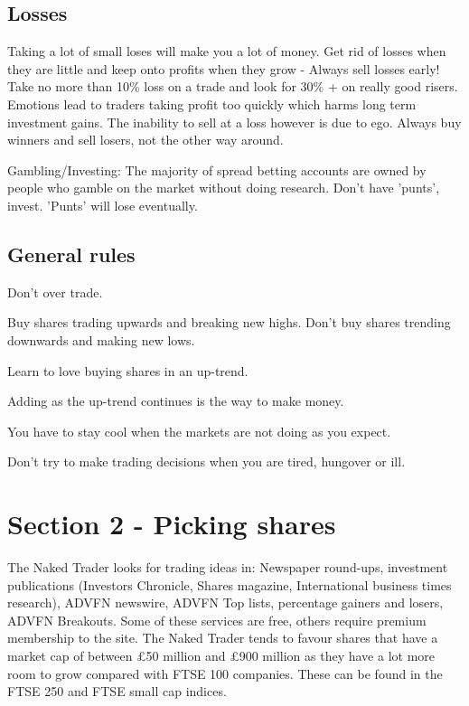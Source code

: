 \subsection*{Losses}
Taking a lot of small loses will make you a lot of money.
Get rid of losses when they are little and keep onto profits when they grow - Always sell losses early!
Take no more than 10\% loss on a trade and look for 30\% + on really good risers.
Emotions lead to traders taking profit too quickly which harms long term investment gains.
The inability to sell at a loss however is due to ego.
Always buy winners and sell losers, not the other way around.

Gambling/Investing: The majority of spread betting accounts are owned by people who gamble on the market without doing research.
Don't have 'punts', invest.
'Punts' will lose eventually.

\subsection*{General rules}
\begin{enumerate*}
\item Don't over trade.
\item Buy shares trading upwards and breaking new highs. Don't buy shares trending downwards and making new lows.
\item Learn to love buying shares in an up-trend.
\item Adding as the up-trend continues is the way to make money.
\item You have to stay cool when the markets are not doing as you expect.
\item Don't try to make trading decisions when you are tired, hungover or ill.
\end{enumerate*}

\section*{Section 2 - Picking shares}
The Naked Trader looks for trading ideas in: Newspaper round-ups, investment publications (Investors Chronicle, Shares magazine, International business times research), ADVFN newswire, ADVFN Top lists, percentage gainers and losers, ADVFN Breakouts. 
Some of these services are free, others require premium membership to the site.
The Naked Trader tends to favour shares that have a market cap of between \pounds 50 million and \pounds 900 million as they have a lot more room to grow compared with FTSE 100 companies.
These can be found in the FTSE 250 and FTSE small cap indices. 

